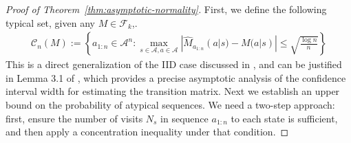\documentclass{article}
\theoremstyle{plain}
\theoremstyle{definition}
\theoremstyle{remark}
\begin{document}
\begin{proof}[Proof of Theorem~\ref{thm:asymptotic-normality}]
First, we define the following typical set, given any $M \in \mathcal{F}_k$,. 
\begin{align}
    \mathcal{C}_n(M):=\left\{ a_{1:n}\in \mathcal{A}^n: \max_{s\in \mathcal{A}, a\in \mathcal{A}}|\hat{M}_{a_{1:n}}(a|s)-M(a|s)|\le \sqrt{\frac{\log n}{n}}\right\}
\end{align}
This is  a direct generalization of the IID  case discussed in \cite{zhou2018secondorderasymptoticallyoptimalstatistical}, and can be justified in Lemma 3.1 of \cite{wolfer2023empiricalinstancedependentestimationmarkov}, which provides a precise asymptotic analysis of the confidence interval width for estimating the transition matrix. Next we establish an upper bound on the probability of atypical sequences. We need a two-step approach: first, ensure the number of visits $N_s$ in sequence $a_{1:n}$ to each state is sufficient, and then apply a concentration inequality under that condition.


\end{proof}
\end{document}
